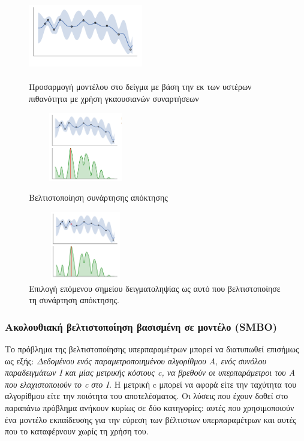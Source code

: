 \documentclass{article}
\begin{document}
\begin{figure}[H]
\begin{minipage}[c][11cm][t]{.5\textwidth}
\end{minipage}
\begin{minipage}[c][11cm][t]{.5\textwidth}
  \vspace*{\fill}
  \centering
  \includegraphics[width=5cm,height=3cm]{posterior.png}
  \caption[Προσαρμογή μοντέλου στο δείγμα με βάση την εκ των υστέρων πιθανότητα]{Προσαρμογή μοντέλου στο δείγμα με βάση την εκ των υστέρων πιθανότητα με χρήση γκαουσιανών συναρτήσεων }
  \label{fig:test2}\par\vfill
  \includegraphics[width=5cm,height=3cm]{optimize.png}
  \caption[Βελτιστοποίηση συνάρτησης απόκτησης]{Βελτιστοποίηση συνάρτησης απόκτησης }
\end{minipage}
\begin{minipage}[c][5cm][t]{\textwidth}
  \centering
  \includegraphics[width=5cm,height=3cm]{next.png}
  \caption[Επιλογή επόμενου σημείου δειγματοληψίας ]{Επιλογή επόμενου σημείου δειγματοληψίας ως αυτό που βελτιστοποίησε τη συνάρτηση απόκτησης.}
  \label{fig:test2}\par\vfill
\end{minipage}
\end{figure}
\subsubsection{Ακολουθιακή βελτιστοποίηση βασισμένη σε μοντέλο (SMBO)}
Το πρόβλημα της βελτιστοποίησης υπερπαραμέτρων μπορεί να διατυπωθεί επισήμως ως εξής: \textit{Δεδομένου ενός παραμετροποιημένου αλγορίθμου Α, ενός συνόλου παραδειγμάτων I και μίας μετρικής κόστους c, να βρεθούν οι υπερπαράμετροι του Α που ελαχιστοποιούν το c στο Ι.} Η μετρική c μπορεί να αφορά είτε την ταχύτητα του αλγορίθμου είτε την ποιότητα του αποτελέσματος. Οι λύσεις που έχουν δοθεί στο παραπάνω πρόβλημα ανήκουν κυρίως σε δύο κατηγορίες: αυτές που χρησιμοποιούν ένα μοντέλο εκπαίδευσης για την εύρεση των βέλτιστων υπερπαραμέτρων και αυτές που το καταφέρνουν χωρίς τη χρήση του.
\end{document}
